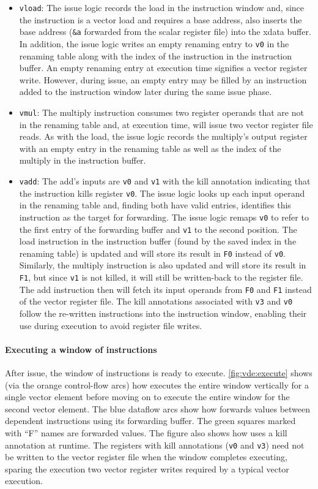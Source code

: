 \begin{itemize}
\item {\tt vload}:
The issue logic records the load in the instruction window and, since the instruction
is a vector load and requires a base address, also inserts the base address ({\tt \&a} forwarded from the scalar register file) into the xdata buffer.
% 
In addition, the issue logic writes an empty renaming entry to {\tt v0} in the renaming table along with the index of the instruction in the instruction buffer.
%
An empty renaming entry at execution time signifies a vector register write.
However, during issue, an empty entry may be filled by an instruction added to
the instruction window later during the same issue phase.
\item {\tt vmul}: The multiply instruction consumes two register operands that are not in the renaming table and, at execution time, will issue
two vector register file reads.
%
As with the load, the issue logic records the multiply's output register with 
an empty entry in the renaming table as well as the index of the multiply in the
instruction buffer.
\item {\tt vadd}:
The add's inputs are {\tt v0} and {\tt v1} with the kill annotation indicating
that the instruction kills register {\tt v0}.
%
The issue logic looks up each input operand in the renaming table and, finding 
both have valid entries, identifies this instruction as the target for forwarding.
%
The issue logic remaps {\tt v0} to refer to the first entry of the forwarding
buffer and {\tt v1} to the second position. 
%
The load instruction in the instruction buffer (found by the saved index in the renaming table) 
is updated and will store its result in {\tt F0} instead of {\tt v0}.
%
Similarly, the multiply instruction is also updated and will store its result in {\tt F1}, but since {\tt v1} is not killed, it will still be written-back to the register file. 
%
The add instruction then will fetch its input operands from {\tt F0}
and {\tt F1} instead of the vector register file.
%
The kill annotations associated with {\tt v3} and {\tt v0} follow the re-written
instructions into the instruction window, enabling their use during execution
to avoid register file writes.
\end{itemize}

\paragraph{Executing a window of instructions}
After issue, the window of instructions is ready to execute.
\autoref{fig:vde:execute} shows (via the orange control-flow arcs) how \manic
executes the entire window vertically for a single vector element before moving
on to execute the entire window for the second vector element.
%
The blue dataflow arcs show how \manic forwards values between dependent
instructions using its forwarding buffer.  The green squares marked with ``F'' names
are forwarded values.
%
The figure also shows how \manic uses a kill annotation at runtime.
%
The registers with kill annotations ({\tt v0} and {\tt v3}) need not be written
to the vector register file when the window completes executing, sparing the
execution two vector register writes required by a typical vector execution. 

